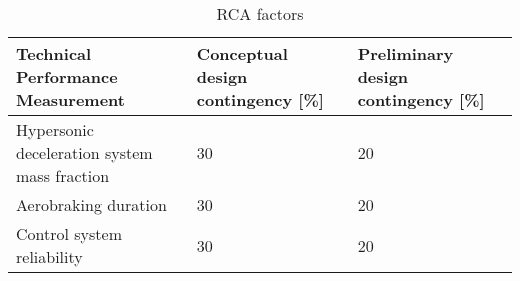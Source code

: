 \begin{table}[h]
	\centering
	\caption{RCA factors}
	\label{tab:tpm}
	\begin{tabular}{|p{}|p{}|p{}|}
		\hline
		\textbf{Technical Performance Measurement} & \textbf{Conceptual design contingency [\%]} & \textbf{Preliminary design contingency [\%]} \\ \hline
		Hypersonic deceleration system mass fraction & 30 & 20 \\ \hline
		Aerobraking duration & 30 & 20 \\ \hline
		Control system reliability & 30 & 20 \\ \hline
	\end{tabular}
\end{table}